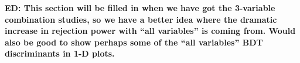 {\bf
  ED: This section will be filled in when we have got the 3-variable
  combination studies, so we have a better idea where the dramatic
  increase in rejection power with ``all variables'' is coming
  from. Would also be good to show perhaps some of the ``all
  variables'' BDT discriminants in 1-D plots.}


%
%
%
%
